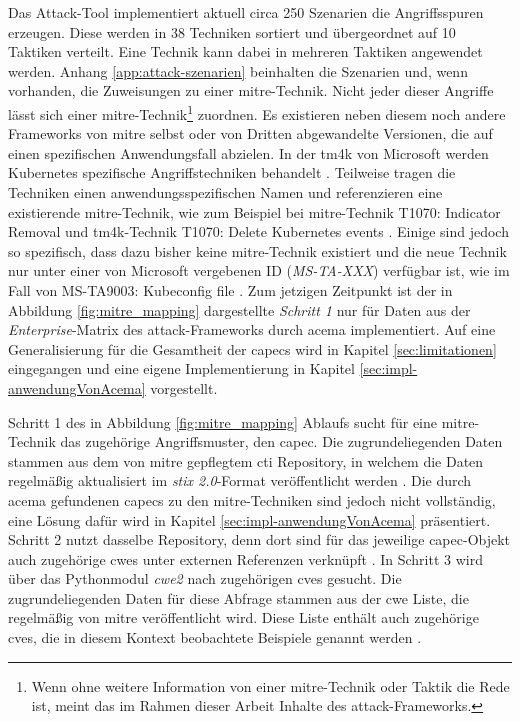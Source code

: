 \par Das Attack-Tool implementiert aktuell circa 250 Szenarien die Angriffsspuren erzeugen. Diese werden in 38 Techniken sortiert und übergeordnet auf 10 Taktiken verteilt. Eine Technik kann dabei in mehreren Taktiken angewendet werden. Anhang \ref{app:attack-szenarien} beinhalten die Szenarien und, wenn vorhanden, die Zuweisungen zu einer \gls{mitre}-Technik. Nicht jeder dieser Angriffe lässt sich einer \gls{mitre}-Technik\footnote{Wenn ohne weitere Information von einer \gls{mitre}-Technik oder Taktik die Rede ist, meint das im Rahmen dieser Arbeit Inhalte des \gls{attack}-Frameworks.} zuordnen. Es existieren neben diesem noch andere Frameworks von \gls{mitre} selbst oder von Dritten abgewandelte Versionen, die auf einen spezifischen Anwendungsfall abzielen. In der \gls{tm4k} von Microsoft werden Kubernetes spezifische Angriffstechniken behandelt \autocite{TacticsThreatMatrix}. Teilweise tragen die Techniken einen anwendungsspezifischen Namen und referenzieren eine existierende \gls{mitre}-Technik, wie zum Beispiel bei \gls{mitre}-Technik \glqq{}T1070: Indicator Removal\grqq{} und \gls{tm4k}-Technik \glqq{}T1070: Delete Kubernetes events\grqq{} \autocite{IndicatorRemovalTechnique,DeleteKubernetesEvents}. Einige sind jedoch so spezifisch, dass dazu bisher keine \gls{mitre}-Technik existiert und die neue Technik nur unter einer von Microsoft vergebenen ID (\textit{MS-TA-XXX}) verfügbar ist, wie im Fall von \glqq{}MS-TA9003: Kubeconfig file\grqq{} \autocite{KubeconfigFileThreat}. Zum jetzigen Zeitpunkt ist der in Abbildung \ref{fig:mitre_mapping} dargestellte \textit{Schritt 1} nur für Daten aus der \textit{Enterprise}-Matrix des \gls{attack}-Frameworks durch \gls{acema} implementiert. Auf eine Generalisierung für die Gesamtheit der \glspl{capec} wird in Kapitel \ref{sec:limitationen} eingegangen und eine eigene Implementierung in Kapitel \ref{sec:impl-anwendungVonAcema} vorgestellt.
\par Schritt 1 des in Abbildung \ref{fig:mitre_mapping} Ablaufs sucht für eine \gls{mitre}-Technik das zugehörige Angriffsmuster, den \gls{capec}. Die zugrundeliegenden Daten stammen aus dem von \gls{mitre} gepflegtem \gls{cti} Repository, in welchem die Daten regelmäßig aktualisiert im \textit{\gls{stix} 2.0}-Format veröffentlicht werden \autocite{IntroductionSTIX,MitreCtiCyber}. Die durch \gls{acema} gefundenen \glspl{capec} zu den \gls{mitre}-Techniken sind jedoch nicht vollständig, eine Lösung dafür wird in Kapitel \ref{sec:impl-anwendungVonAcema} präsentiert. Schritt 2 nutzt dasselbe Repository, denn dort sind für das jeweilige \gls{capec}-Objekt auch zugehörige \glspl{cwe} unter externen Referenzen verknüpft \autocite{CtiUSAGEmdMaster}. In Schritt 3 wird über das Pythonmodul \textit{cwe2} nach zugehörigen \glspl{cve} gesucht. Die zugrundeliegenden Daten für diese Abfrage stammen aus der \gls{cwe} Liste, die regelmäßig von \gls{mitre} veröffentlicht wird. Diese Liste enthält auch zugehörige \glspl{cve}, die in diesem Kontext \glqq{}beobachtete Beispiele\grqq{} genannt werden \autocite{AboutcodeorgCwe22024,CWEDownloads}.
